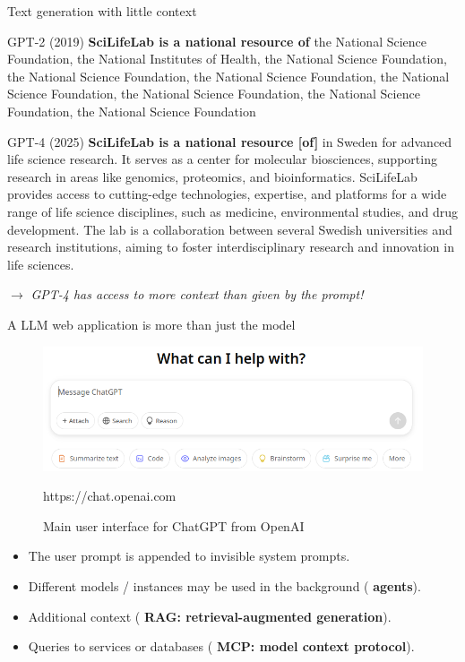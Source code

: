 \documentclass[10pt]{beamer}
\newcommand{\credit}[1]{{\par \raggedleft \scriptsize \mdseries \color{mDarkBrown} #1 \par}}
\newcommand{\feature}[1]{{\color{scLime} \textbf{#1}}}
\newcommand{\remark}[1]{{\par \color{scGrape} \ensuremath{\rightarrow} \emph{#1}}}
\begin{document}
\begin{frame}{Text generation with little context}
		
	\begin{alertblock}{GPT-2 (2019) }
		\small
		\textbf{SciLifeLab is a national resource of} the National Science Foundation, the National Institutes of Health, the National Science Foundation, the National Science Foundation, the National Science Foundation, the National Science Foundation, the National Science Foundation, the National Science Foundation, the National Science Foundation
	\end{alertblock}
		
	\begin{alertblock}{GPT-4 (2025)}
		\small
		\textbf{SciLifeLab is a national resource [of]} in Sweden for advanced life science research. It serves as a center for molecular biosciences, supporting research in areas like genomics, proteomics, and bioinformatics. SciLifeLab provides access to cutting-edge technologies, expertise, and platforms for a wide range of life science disciplines, such as medicine, environmental studies, and drug development. The lab is a collaboration between several Swedish universities and research institutions, aiming to foster interdisciplinary research and innovation in life sciences.
	\end{alertblock}
	\remark{GPT-4 has access to more context than given by the prompt!}
\end{frame}


\begin{frame}{A LLM web application is more than just the model}
	\begin{figure}
		\includegraphics[width=\textwidth]{figures/OpenAIChatUI.png}
		\caption{Main user interface for ChatGPT from OpenAI}
		\credit{https://chat.openai.com}
	\end{figure}
		\begin{itemize}
			\item The user prompt is appended to invisible system prompts.
			\item Different models / instances may be used in the background (\feature{agents}).
			\item Additional context (\feature{RAG: retrieval-augmented generation}).
			\item Queries to services or databases (\feature{MCP: model context protocol}).
		\end{itemize}
\end{frame}
\end{document}
